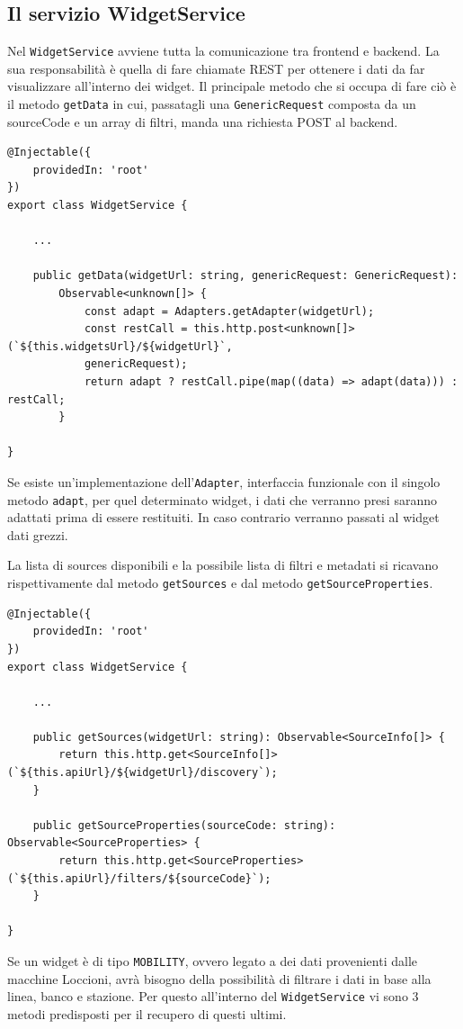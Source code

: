 \subsection{Il servizio WidgetService}
Nel \verb|WidgetService| avviene tutta la comunicazione tra frontend e backend.
La sua responsabilità è quella di fare chiamate REST per ottenere i dati da far visualizzare all'interno dei widget. Il principale metodo che si occupa di fare ciò è il metodo \verb|getData| in cui, passatagli una \verb|GenericRequest| composta da un sourceCode e un array di filtri, manda una richiesta POST al backend.

\begin{lstlisting}[caption={Metodo getData all'interno della classe WidgetService}, style=javaScriptCode]
@Injectable({
    providedIn: 'root'
})
export class WidgetService {

    ...

    public getData(widgetUrl: string, genericRequest: GenericRequest): 
        Observable<unknown[]> {
            const adapt = Adapters.getAdapter(widgetUrl);
            const restCall = this.http.post<unknown[]>(`${this.widgetsUrl}/${widgetUrl}`, 
            genericRequest);
            return adapt ? restCall.pipe(map((data) => adapt(data))) : restCall;
        }

}

\end{lstlisting}
Se esiste un'implementazione dell'\verb|Adapter|, interfaccia funzionale con il singolo metodo \verb|adapt|, per quel determinato widget, i dati che verranno presi saranno adattati prima di essere restituiti. In caso contrario verranno passati al widget dati grezzi.

La lista di sources disponibili e la possibile lista di filtri e metadati si ricavano rispettivamente dal metodo \verb|getSources| e dal metodo \verb|getSourceProperties|.

\begin{lstlisting}[caption={Metodi getSources e getSourceProperties all'interno della classe WidgetService}, style=javaScriptCode]
@Injectable({
    providedIn: 'root'
})
export class WidgetService {

    ...
        
    public getSources(widgetUrl: string): Observable<SourceInfo[]> {
        return this.http.get<SourceInfo[]>(`${this.apiUrl}/${widgetUrl}/discovery`);
    }

    public getSourceProperties(sourceCode: string): Observable<SourceProperties> {
        return this.http.get<SourceProperties>(`${this.apiUrl}/filters/${sourceCode}`);
    }

}
\end{lstlisting}
Se un widget è di tipo \verb|MOBILITY|, ovvero legato a dei dati provenienti dalle macchine Loccioni, avrà bisogno della possibilità di filtrare i dati in base alla linea, banco e stazione. Per questo all'interno del \verb|WidgetService| vi sono 3 metodi predisposti per il recupero di questi ultimi.

